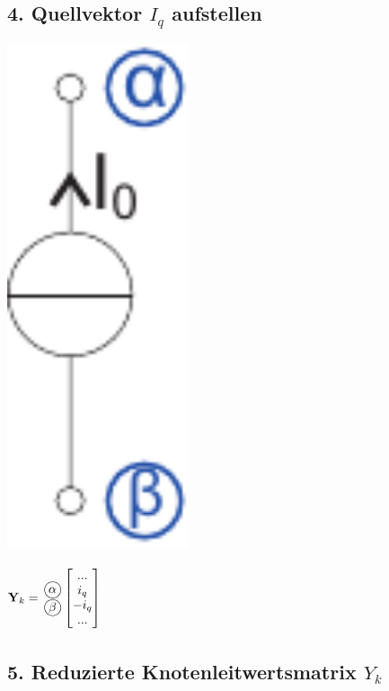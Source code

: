 \documentclass[a4paper,twocolumn,10pt]{article}
\newcommand*\kreis[1]{\unitlength1ex\begin{picture}(2.5,2.5)%
\put(0.75,0.75){\circle{3}}\put(0.7,0.7){\makebox(0,0){#1}}\end{picture}}
\begin{document}
\subsection*{4. Quellvektor $I_q$ aufstellen}
\begin{minipage}[b]{0.10\textwidth}
\includegraphics[width=0.4\textwidth]{Grafiken/KSA_Stromquelle}
\end{minipage}
\hfill
\begin{minipage}[b]{0.30\textwidth}
$\textbf{Y}_k=\;\;\begin{matrix} \; \\ \kreis{$\alpha$} \\ \kreis{$\beta$} \\ \; \end{matrix} \left[\begin{matrix} ... \\ i_q \\ -i_q \\ ... \end{matrix}\right]$\\
\end{minipage}

\subsection*{5. Reduzierte Knotenleitwertsmatrix $Y_k$}
\end{document}
